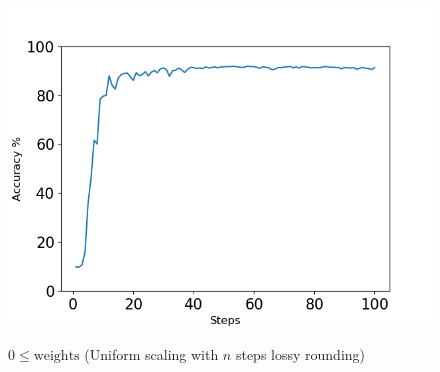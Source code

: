 \begin{figure}[H]
{		\includegraphics[scale=0.55]{exceeds/input 20 conv maxpool 50 conv maxpool 10 dense step uniform 91.89 max at 58 and 60.06 at 8.png}    
	}
	\caption{$0 \leq \text{weights}$ (Uniform scaling with $n$ steps lossy rounding)
	}
	\label{fig:clipuniform}
\end{figure}
